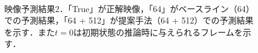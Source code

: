 \begin{figure}[tp]
    \centering
    \\
    \caption[映像予測結果2]{映像予測結果2．「True」が正解映像，「64」がベースライン（64）での予測結果，「64 + 512」が提案手法（64 + 512）での予測結果を示す．また$t = 0$は初期状態の推論時に与えられるフレームを示す．}
    \label{fig:compare_cd}
\end{figure}

